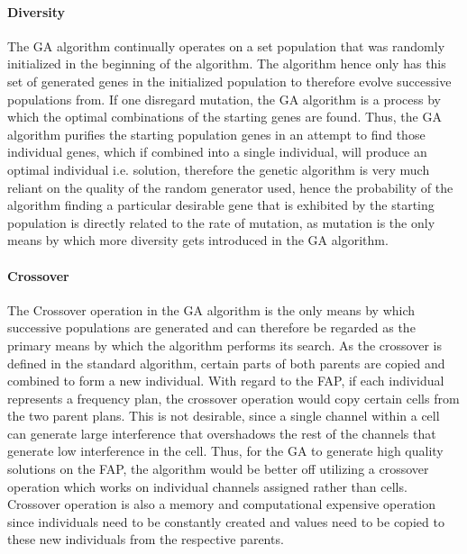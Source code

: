 \paragraph{Diversity}
The GA algorithm continually operates on a set population that was randomly initialized in the beginning of the algorithm. The algorithm hence only has this set of generated genes in the initialized population to therefore evolve successive populations from.
If one disregard mutation, the GA algorithm is a process by which the optimal combinations of the starting genes are found. Thus, the GA algorithm purifies the starting population genes in an attempt to find those individual genes, which if combined into a single individual, will produce an optimal individual i.e. solution, therefore the genetic algorithm is very much reliant on the quality of the random generator used, hence the probability of the algorithm finding a particular desirable gene that is exhibited by the starting population is directly related to the rate of mutation, as mutation is the only means by which more diversity gets introduced in the GA algorithm.
\paragraph{Crossover}
The Crossover operation in the GA algorithm is the only means by which successive populations are generated and can therefore be regarded as the primary means by which the algorithm performs its search. As the crossover is defined in the standard algorithm, certain parts of both parents are copied and combined to form a new individual. With regard to the FAP, if each individual represents a frequency plan, the crossover operation would copy certain cells from the two parent plans. This is not desirable, since a single channel within a cell can generate large interference that overshadows the rest of the channels that generate low interference in the cell. Thus, for the GA to generate high quality solutions on the FAP, the algorithm would be better off utilizing a crossover operation which works on individual channels assigned rather than cells. Crossover operation is also a memory and computational expensive operation since individuals need to be constantly created and values need to be copied to these new individuals from the respective parents.
